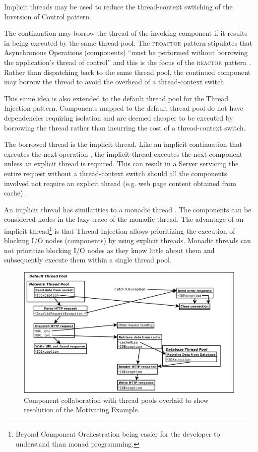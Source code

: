 \documentclass[prodmode]{style/acmlarge}
\begin{document}
Implicit threads may be used to reduce the thread-context switching of the
Inversion of Control pattern.

The continuation may borrow the thread of the invoking component if it results
in being executed by the same thread pool.  The \textsc{proactor} pattern
stipulates that Asynchronous Operations (components) ``must be performed without
borrowing the application's thread of control'' \cite[p. 8]{proactor} and this
is the focus of the \textsc{reactor} pattern \cite{reactor}.  Rather than
dispatching back to the same thread pool, the continued component may borrow the
thread to avoid the overhead of a thread-context switch.

This same idea is also extended to the default thread pool for the Thread
Injection pattern.  Components mapped to the default thread pool do
not have dependencies requiring isolation and are deemed cheaper to be executed
by borrowing the thread rather than incurring the cost of a thread-context
switch.

The borrowed thread is the implicit thread.  Like an implicit continuation that
executes the next operation \cite{continuations}, the implicit thread executes
the next component unless an explicit thread is required.  This can result in
a Server servicing the entire request without a thread-context switch
should all the components involved not require an explicit thread
(e.g. web page content obtained from cache).

An implicit thread has similarities to a monadic thread \cite{monadic-thread}.
The components can be considered nodes in the lazy trace of the monadic thread. 
The advantage of an implicit thread\footnote{Beyond Component Orchestration
being easier for the developer to understand than monad programming.} is that
Thread Injection allows prioritizing the execution of blocking I/O nodes
(components) by using explicit threads.  Monadic threads can not prioritize
blocking I/O nodes as they know little about them and subsequently execute them
within a single thread pool.

\begin{figure}[t]
\centering
\includegraphics[width=4.5in]{IocMotivatingExampleResolved}
\caption{Component collaboration with thread pools overlaid to show resolution of the Motivating Example.}
\label{fig:IocMotivatingExampleResolved}
\end{figure}
\end{document}
